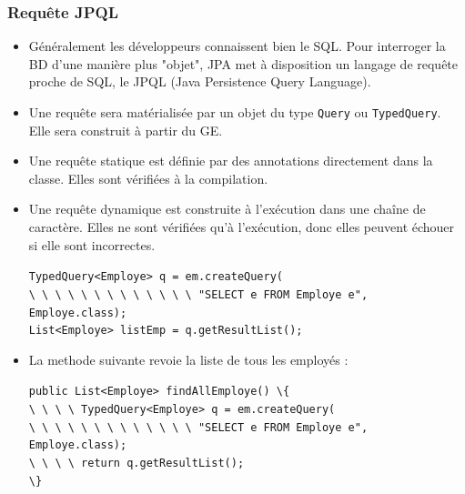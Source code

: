 \documentclass[xcolor=pdftex,x11names,table]{beamer}
\begin{document}
  \begin{frame}[allowframebreaks]
    \frametitle{Requête JPQL}
    \begin{itemize}
      \item Généralement les développeurs connaissent bien le SQL. Pour interroger la BD d'une manière plus "objet", JPA 
      met à disposition un langage de requête proche de SQL, le JPQL (Java Persistence Query Language).
      \item Une requête sera matérialisée par un objet du type \texttt{Query} ou \texttt{TypedQuery}. Elle sera 
      construit à partir du GE.
      \item Une requête  statique est définie par des annotations directement dans la classe. Elles sont vérifiées à la 
      compilation.
      \item Une requête dynamique est construite à l'exécution dans une chaîne de caractère. Elles ne sont vérifiées 
      qu'à l'exécution, donc elles peuvent échouer si elle sont incorrectes.
        \begin{block}{}
      		\lstinline$TypedQuery<Employe> q = em.createQuery($\\
      		\lstinline$\ \ \ \ \ \ \ \ \ \ \ \ \ "SELECT e FROM Employe e", Employe.class);$\\
					\lstinline$List<Employe> listEmp = q.getResultList();$\\
				\end{block}
			\item La methode suivante revoie la liste de tous les employés :
		  	\begin{block}{}
					\lstinline$public List<Employe> findAllEmploye() \{$\\
      		\lstinline$\ \ \ \ TypedQuery<Employe> q = em.createQuery($\\
      		\lstinline$\ \ \ \ \ \ \ \ \ \ \ \ \ "SELECT e FROM Employe e", Employe.class);$\\
					\lstinline$\ \ \ \ return q.getResultList();$\\
					\lstinline$\}$\\
				\end{block}
    \end{itemize}
  \end{frame}
  
\end{document}
